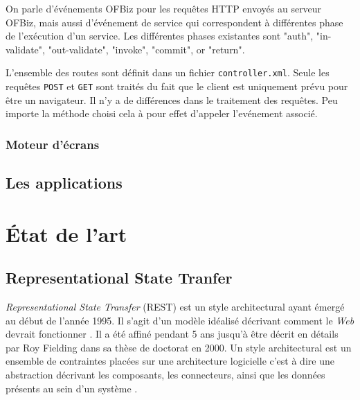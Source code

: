 \documentclass[a4paper, 11pt]{report}
\begin{document}
On parle d'événements OFBiz pour les requêtes HTTP envoyés au serveur
OFBiz, mais aussi d'événement de service qui correspondent à
différentes phase de l'exécution d'un service.  Les différentes phases
existantes sont "auth", "in-validate", "out-validate", "invoke",
"commit", or "return".

L'ensemble des routes sont définit dans un fichier
\verb=controller.xml=.  Seule les requêtes \verb=POST= et \verb=GET=
sont traités du fait que le client est uniquement prévu pour être un
navigateur.  Il n'y a de différences dans le traitement des requêtes.
Peu importe la méthode choisi cela à pour effet d'appeler l'evénement
associé.

\subsection{Moteur d'écrans}

\section{Les applications}

\chapter{État de l'art}

\section{Representational State Tranfer}

\emph{Representational State Transfer} (REST) est un style
architectural ayant émergé au début de l'année 1995.  Il s'agit d'un
modèle idéalisé décrivant comment le \emph{Web} devrait fonctionner
\cite{fielding2002principled}.  Il a été affiné pendant 5 ans jusqu'à
être décrit en détails par Roy Fielding dans sa thèse de doctorat
\cite{fielding2000architectural} en 2000.  Un style architectural est
un ensemble de contraintes placées sur une architecture logicielle
c'est à dire une abstraction décrivant les composants, les
connecteurs, ainsi que les données présents au sein d'un système
\cite{perry1992foundations}.
\end{document}
